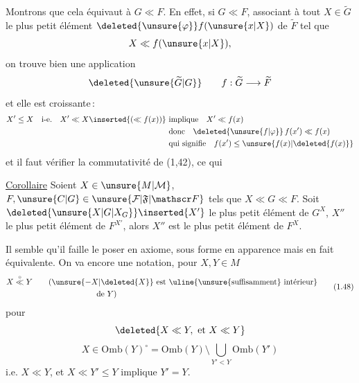 Montrons que cela équivaut à $G\ll F$. En effet, si $G\ll F$, associant à tout $X\in\widetilde G$ le plus petit élément $\deleted{\unsure{\varphi}}f(\unsure{x|X})$ de $\widetilde F$ tel que
\[
 X\ll f(\unsure{x|X}),
\]
on trouve bien une application
\[
 \deleted{\unsure{\widetilde G|G}}\qquad f:\widetilde G\longrightarrow\widetilde F
\]
et elle est  croissante\,: 
\[
\begin{aligned}
 X'\leq X\quad\text{i-e.}\quad X'\ll X\inserted{(\ll f(x))}\ &\text{implique}\quad X'\ll f(x)\\
 &\text{donc}\quad\deleted{\unsure{f|\varphi}}\,f(x')\ll f(x)\\
 &\text{qui signifie}\quad f(x')\leq\unsure{f(x)|\deleted{f(x)}}
\end{aligned}
\]
et il faut vérifier la commutativité de (1,42), ce qui  

\uline{Corollaire} Soient $X\in\unsure{M|\mathcal M}$, $F,\unsure{C|G}\in\unsure{\mathcal F|\mathfrak F|\mathscr F}$ tels que $X\ll G\ll F$.
Soit $\deleted{\unsure{X|G|X_G}}\inserted{X'}$ le plus petit élément de $G^X$, $X''$ le plus petit élément de $F^{X'}$, alors $X''$ est  le plus petit élément de $F^X$.

Il semble qu'il faille le poser en axiome, sous forme en apparence \unsure{;|,} mais en fait équivalente. On va   encore une notation, pour $X,Y\in M$
\[
\begin{aligned}
 X\overset{\circ}{\ll}Y\qquad &(\unsure{-X|\deleted{X}}\text{ est \uline{\unsure{suffisamment} intérieur}}\\
 &\hspace{6em}\text{de }Y)
\end{aligned}
\tag*{(1.48)}
\]
pour
\[
 \deleted{X\ll Y,\ \text{et}\ X\ll Y}
\]
\[
 X\in\mathrm{Omb}(Y)^{\circ}=\mathrm{Omb}(Y)\setminus\bigcup_{Y'<Y}\mathrm{Omb}(Y')
\]
i.e. $X\ll Y$, et $X\ll Y'\leq Y$ implique $Y'=Y$.
